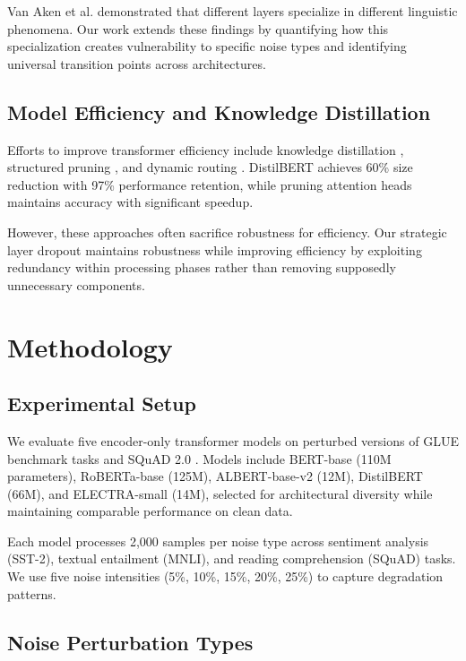 \documentclass{article}
\begin{document}
Van Aken et al. \cite{vanaken2019bert} demonstrated that different layers specialize in different linguistic phenomena. Our work extends these findings by quantifying how this specialization creates vulnerability to specific noise types and identifying universal transition points across architectures.

\subsection{Model Efficiency and Knowledge Distillation}

Efforts to improve transformer efficiency include knowledge distillation \cite{sanh2019distilbert}, structured pruning \cite{michel2019sixteen}, and dynamic routing \cite{wang2020dual}. DistilBERT achieves 60\% size reduction with 97\% performance retention, while pruning attention heads maintains accuracy with significant speedup.

However, these approaches often sacrifice robustness for efficiency. Our strategic layer dropout maintains robustness while improving efficiency by exploiting redundancy within processing phases rather than removing supposedly unnecessary components.

\section{Methodology}

\subsection{Experimental Setup}

We evaluate five encoder-only transformer models on perturbed versions of GLUE benchmark tasks \cite{wang2018glue} and SQuAD 2.0 \cite{rajpurkar2018squad}. Models include BERT-base (110M parameters), RoBERTa-base (125M), ALBERT-base-v2 (12M), DistilBERT (66M), and ELECTRA-small (14M), selected for architectural diversity while maintaining comparable performance on clean data.

Each model processes 2,000 samples per noise type across sentiment analysis (SST-2), textual entailment (MNLI), and reading comprehension (SQuAD) tasks. We use five noise intensities (5\%, 10\%, 15\%, 20\%, 25\%) to capture degradation patterns.

\subsection{Noise Perturbation Types}
\end{document}
